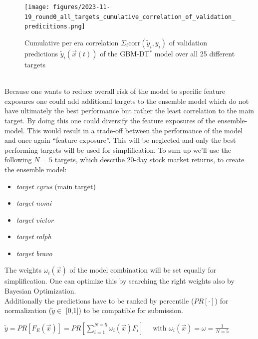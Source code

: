 \documentclass[12pt, a4paper]{article}
\begin{document}
\begin{figure}[!htpb]
    \centering
    \texttt{[image: figures/2023-11-19\_round0\_all\_targets\_cumulative\_correlation\_of\_validation\_predicitions.png]}
    \caption[Cumulative per era correlation of validation predictions over the GBM-DT$^{\ast}$ models over all different targets]{Cumulative per era correlation $\Sigma_i \text{corr}(\tilde{y}_i,y_i)$ of validation predictions $\tilde{y}_i(\vec{x}(t))$ of the GBM-DT$^{\ast}$ model over all 25 different targets}
    \label{fig: cum_corr_val_preds_all_targets}
\end{figure}
\\
Because one wants to reduce overall risk of the model to specific feature exposures one could add additional targets to the ensemble model which do not have ultimately the best performance but rather the least correlation to the main target. By doing this one could diversify the feature exposures of the ensemble-model. This would result in a trade-off between the performance of the model and once again ``feature exposure''. This will be neglected and only the best performing targets will be used for simplification.
To sum up we'll use the following $N = 5$ targets, which describe 20-day stock market returns, to create the ensemble model: \\
\begin{itemize}
    \item \textit{target cyrus} (main target)
    \item \textit{target nomi}
    \item \textit{target victor}
    \item \textit{target ralph}
    \item \textit{target bravo}
\end{itemize}
The weights $\omega_i(\vec{x})$ of the model combination will be set equally for simplification. One can optimize this by searching the right weights also by Bayesian Optimization. \\
Additionally the predictions have to be ranked by percentile ($PR[\cdot]$) for normalization ($\tilde{y} \in$ [0,1]) to be compatible for submission.
\begin{center}
    $\tilde{y} = PR[F_E(\vec{x})] = PR[\sum_{i=1}^{N=5} \omega_i(\vec{x}) F_i] \quad$ with $\omega_i(\vec{x}) = \omega = \frac{1}{N=5}$
\end{center}
\end{document}

